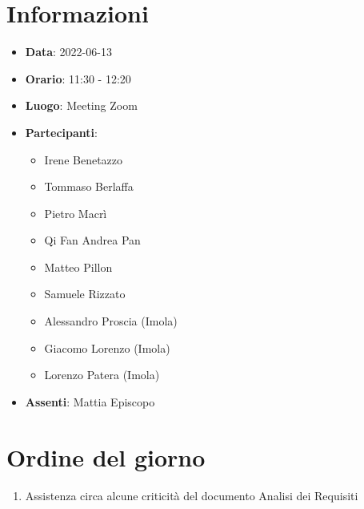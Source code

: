 \section{Informazioni}
	\begin{itemize}
		\item \textbf{Data}: 2022-06-13     %
		\item \textbf{Orario}:       11:30 - 12:20       %
		\item \textbf{Luogo}: Meeting Zoom
		\item \textbf{Partecipanti}:
		\begin{itemize}
			\item Irene Benetazzo
			\item Tommaso Berlaffa
			\item Pietro Macrì
			\item Qi Fan Andrea Pan
			\item Matteo Pillon
			\item Samuele Rizzato
			\item Alessandro Proscia (Imola)
			\item Giacomo Lorenzo (Imola)
			\item Lorenzo Patera (Imola)
		\end{itemize}
        \item \textbf{Assenti}: Mattia Episcopo
	\end{itemize}
    
	\section{Ordine del giorno}
	\begin{enumerate}
		\item Assistenza circa alcune criticità del documento Analisi dei Requisiti
	\end{enumerate}
	\newpage